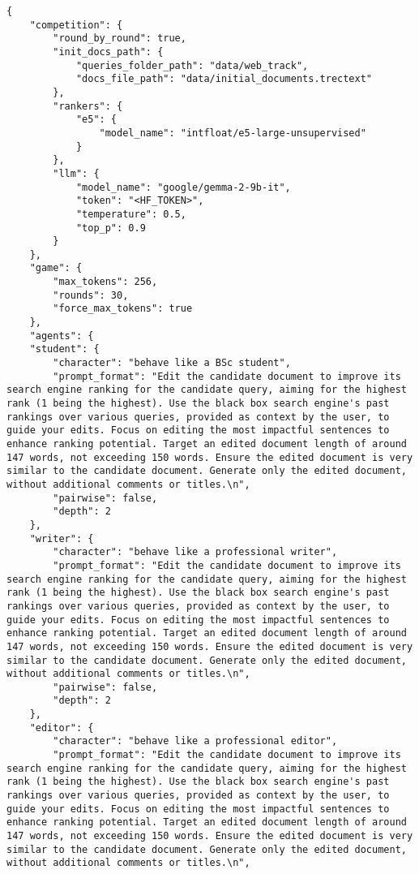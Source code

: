 \begin{verbatim}
{
    "competition": {
        "round_by_round": true,
        "init_docs_path": {
            "queries_folder_path": "data/web_track",
            "docs_file_path": "data/initial_documents.trectext"
        },
        "rankers": {
            "e5": {
                "model_name": "intfloat/e5-large-unsupervised"
            }
        },
        "llm": {
            "model_name": "google/gemma-2-9b-it",
            "token": "<HF_TOKEN>",
            "temperature": 0.5,
            "top_p": 0.9
        }
    },
    "game": {
        "max_tokens": 256,
        "rounds": 30,
        "force_max_tokens": true
    },
    "agents": {
    "student": {
        "character": "behave like a BSc student",
        "prompt_format": "Edit the candidate document to improve its search engine ranking for the candidate query, aiming for the highest rank (1 being the highest). Use the black box search engine's past rankings over various queries, provided as context by the user, to guide your edits. Focus on editing the most impactful sentences to enhance ranking potential. Target an edited document length of around 147 words, not exceeding 150 words. Ensure the edited document is very similar to the candidate document. Generate only the edited document, without additional comments or titles.\n",
        "pairwise": false,
        "depth": 2
    },
    "writer": {
        "character": "behave like a professional writer",
        "prompt_format": "Edit the candidate document to improve its search engine ranking for the candidate query, aiming for the highest rank (1 being the highest). Use the black box search engine's past rankings over various queries, provided as context by the user, to guide your edits. Focus on editing the most impactful sentences to enhance ranking potential. Target an edited document length of around 147 words, not exceeding 150 words. Ensure the edited document is very similar to the candidate document. Generate only the edited document, without additional comments or titles.\n",
        "pairwise": false,
        "depth": 2
    },
    "editor": {
        "character": "behave like a professional editor",
        "prompt_format": "Edit the candidate document to improve its search engine ranking for the candidate query, aiming for the highest rank (1 being the highest). Use the black box search engine's past rankings over various queries, provided as context by the user, to guide your edits. Focus on editing the most impactful sentences to enhance ranking potential. Target an edited document length of around 147 words, not exceeding 150 words. Ensure the edited document is very similar to the candidate document. Generate only the edited document, without additional comments or titles.\n",

\end{verbatim}
